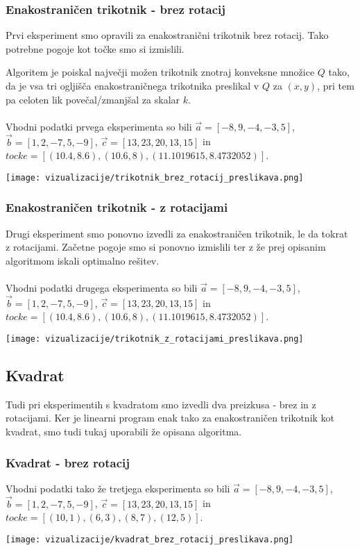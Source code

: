 \documentclass[a4paper, 12pt]{article}
\begin{document}
\subsubsection{Enakostraničen trikotnik - brez rotacij}
Prvi eksperiment smo opravili za enakostranični trikotnik brez rotacij. Tako potrebne pogoje kot točke smo si izmislili.
\newline

Algoritem je poiskal največji možen trikotnik znotraj konveksne množice $Q$ tako, da je vsa tri ogljišča enakostraničnega trikotnika preslikal v $Q$ za $(x,y)$,
pri tem pa celoten lik povečal/zmanjšal za skalar $k$.
\\~\\
Vhodni podatki prvega eksperimenta so bili $\vec{a}=[-8,9,-4,-3,5]$, $\vec{b}=[1,2,-7,5,-9]$, $\vec{c}=[13,23,20,13,15]$ in $tocke = [(10.4,8.6),(10.6,8),(11.1019615,8.4732052)]$.
\begin{center}
    \texttt{[image: vizualizacije/trikotnik\_brez\_rotacij\_preslikava.png]}\\
\end{center}


\subsubsection{Enakostraničen trikotnik - z rotacijami}
Drugi eksperiment smo ponovno izvedli za enakostraničen trikotnik, le da tokrat z rotacijami. Začetne pogoje smo si ponovno izmislili ter z že prej opisanim algoritmom
iskali optimalno rešitev. 
\\~\\
Vhodni podatki drugega eksperimenta so bili $\vec{a}=[-8,9,-4,-3,5]$, $\vec{b}=[1,2,-7,5,-9]$, $\vec{c}=[13,23,20,13,15]$ in $tocke = [(10.4,8.6),(10.6,8),(11.1019615,8.4732052)]$.
\begin{center}
    \texttt{[image: vizualizacije/trikotnik\_z\_rotacijami\_preslikava.png]}\\
\end{center}

\subsection{Kvadrat}
Tudi pri eksperimentih s kvadratom smo izvedli dva preizkusa - brez in z rotacijami. Ker je linearni program enak tako za enakostraničen trikotnik kot kvadrat,
smo tudi tukaj uporabili že opisana algoritma.
 
\subsubsection{Kvadrat - brez rotacij}
Vhodni podatki tako že tretjega eksperimenta so bili $\vec{a}=[-8,9,-4,-3,5]$, $\vec{b}=[1,2,-7,5,-9]$, $\vec{c}=[13,23,20,13,15]$ in $tocke = [(10,1),(6,3), (8,7),(12,5)]$.
\begin{center}
    \texttt{[image: vizualizacije/kvadrat\_brez\_rotacij\_preslikava.png]}\\
\end{center}
\end{document}
